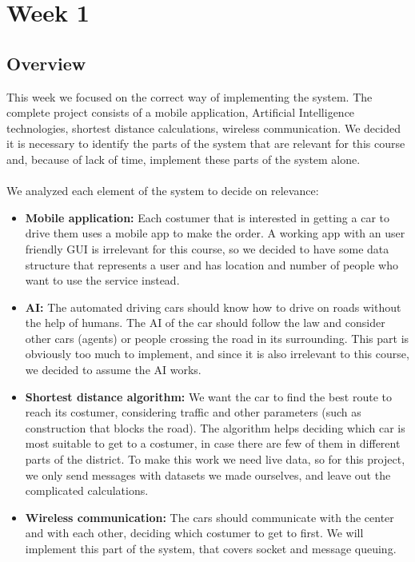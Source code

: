 \documentclass[a4paper]{article}
\begin{document}
\section*{Week 1}
\subsection*{Overview}
This week we focused on the correct way of implementing the system. The complete project consists of a mobile application, Artificial Intelligence technologies, shortest distance calculations, wireless communication. We decided it is necessary to identify the parts of the system that are relevant for this course and, because of lack of time, implement these parts of the system alone.
\\\\We analyzed each element of the system to decide on relevance:
\begin{itemize}
    \item \textbf{Mobile application:} Each costumer that is interested in getting a car to drive them uses a mobile app to make the order. A working app with an user friendly GUI is irrelevant for this course, so we decided to have some data structure that represents a user and has location and number of people who want to use the service instead.
    \item \textbf{AI:} The automated driving cars should know how to drive on roads without the help of humans. The AI of the car should follow the law and consider other cars (agents) or people crossing the road in its surrounding. This part is obviously too much to implement, and since it is also irrelevant to this course, we decided to assume the AI works.
    \item \textbf{Shortest distance algorithm:} We want the car to find the best route to reach its costumer, considering traffic and other parameters (such as construction that blocks the road). The algorithm helps deciding which car is most suitable to get to a costumer, in case there are few of them in different parts of the district. To make this work we need live data, so for this project, we only send messages with datasets we made ourselves, and leave out the complicated calculations.
    \item \textbf{Wireless communication:} The cars should communicate with the center and with each other, deciding which costumer to get to first. We will implement this part of the system, that covers socket and message queuing.
\end{itemize}
\end{document}
